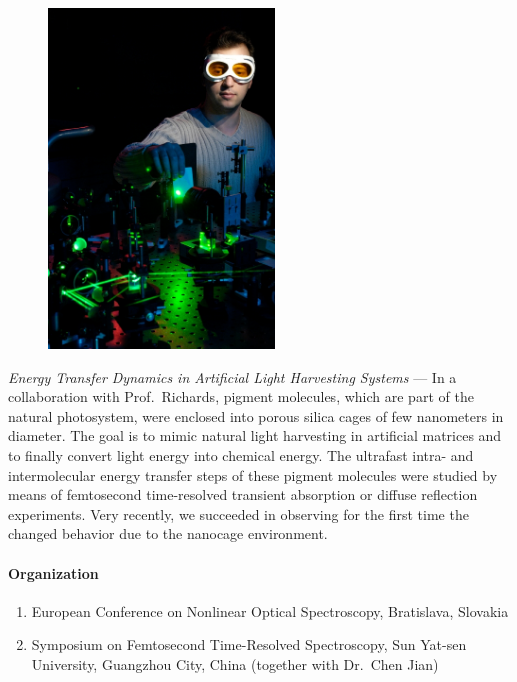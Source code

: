 \begin{figure}[ht]
  \begin{center}
    \includegraphics[width=6cm]{Materny/materny_2006_fig.jpg}
    \label{fig:materny}
   \end{center}
\end{figure}

\textit{Energy Transfer Dynamics in Artificial Light Harvesting
Systems} --- In a collaboration with Prof.\ Richards, pigment
molecules, which are part of the natural photosystem, were
enclosed into porous silica cages of few nanometers in diameter.
The goal is to mimic natural light harvesting in artificial
matrices and to finally convert light energy into chemical energy.
The ultrafast intra- and intermolecular energy transfer steps of
these pigment molecules were studied by means of femtosecond
time-resolved transient absorption or diffuse reflection
experiments. Very recently, we succeeded in observing for the
first time the changed behavior due to the nanocage environment.


\paragraph{Organization}

\begin{enumerate}
\item European Conference on Nonlinear Optical Spectroscopy, Bratislava, Slovakia
\item Symposium on Femtosecond Time-Resolved Spectroscopy, Sun Yat-sen University, Guangzhou City, China (together with Dr.\ Chen Jian)
\end{enumerate}

